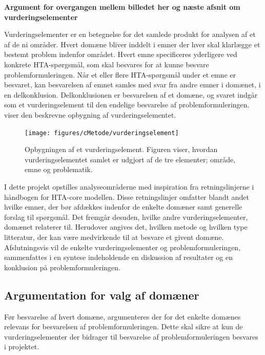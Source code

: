 \textbf{Argument for overgangen mellem billedet her og næste afsnit om vurderingselementer}


Vurderingselementer er en betegnelse for det samlede produkt for analysen af et af de ni områder. Hvert domæne bliver inddelt i emner der hver skal klarlægge et bestemt problem indenfor området. Hvert emne specificeres yderligere ved konkrete HTA-spørgsmål, som skal besvares for at kunne besvare problemformuleringen. Når et eller flere HTA-spørgsmål under et emne er besvaret, kan besvarelsen af emnet samles med svar fra andre emner i domænet, i en delkonklusion. Delkonklusionen er besvarelsen af et domæne, og svaret indgår som et vurderingselement til den endelige besvarelse af problemformuleringen. \citep{HTAcore}  viser den beskrevne opbygning af vurderingselementet. 


\begin{figure}[H] 
\begin{center}
\texttt{[image: figures/cMetode/vurderingselement]}
\end{center}
\caption{Opbygningen af et vurderingselement. Figuren viser, hvordan vurderingselementet samlet er udgjort af de tre elementer; område, emne og problematik.}
\label{fig:vurderingselement} 
\end{figure}


I dette projekt opstilles analyseområderne med inspiration fra retningslinjerne i håndbogen for HTA-core modellen. Disse retningslinjer omfatter blandt andet hvilke emner, der bør afdækkes indenfor de enkelte domæner samt generelle forslag til spørgsmål. Det fremgår desuden, hvilke andre vurderingselementer, domænet relaterer til. Herudover angives det, hvilken metode og hvilken type litteratur, der kan være medvirkende til at besvare et givent domæne. \citep{HTAcore} \\
Afslutningsvis vil de enkelte vurderingselementer og problemformuleringen, sammenfattes i en syntese indeholdende en diskussion af resultater og en konklusion på problemformuleringen. 


\subsection{Argumentation for valg af domæner}
Før besvarelse af hvert domæne, argumenteres der for det enkelte domænes relevans for besvarelsen af problemformuleringen. Dette skal sikre at kun de vurderingselementer der bidrager til besvarelse af problemformuleringen besvares i projektet. 


